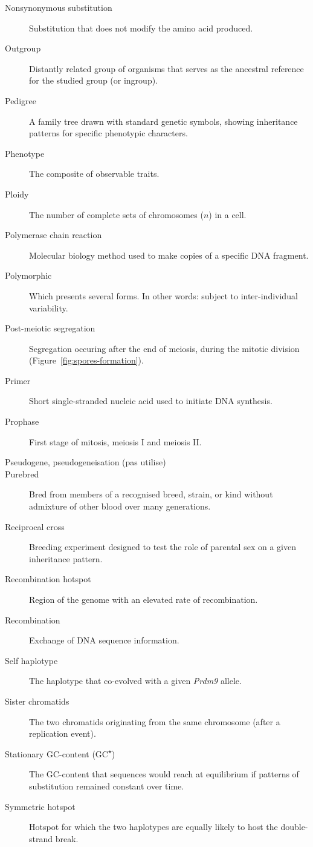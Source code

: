 \begin{alwayssingle}
\begin{description}
		\item[Nonsynonymous substitution] Substitution that does not modify the amino acid produced.
		\item[Outgroup] Distantly related group of organisms that serves as the ancestral reference for the studied group (or ingroup).
		\item[Pedigree] A family tree drawn with standard genetic symbols, showing inheritance patterns for specific phenotypic characters.
		\item[Phenotype] The composite of observable traits.
		\item[Ploidy] The number of complete sets of chromosomes ($n$) in a cell. 
		\item[Polymerase chain reaction] Molecular biology method used to make copies of a specific DNA fragment.
		\item[Polymorphic] Which presents several forms. In other words: subject to inter-individual variability.
		\item[Post-meiotic segregation] Segregation occuring after the end of meiosis, during the mitotic division (Figure~\ref{fig:spores-formation}).
		\item[Primer] Short single-stranded nucleic acid used to initiate DNA synthesis.
		\item[Prophase] First stage of mitosis, meiosis I and meiosis II\@.
		\item[Pseudogene, pseudogeneisation (pas utilise)]
		\item[Purebred] Bred from members of a recognised breed, strain, or kind without admixture of other blood over many generations.
		\item[Reciprocal cross] Breeding experiment designed to test the role of parental sex on a given inheritance pattern.
		\item[Recombination hotspot] Region of the genome with an elevated rate of recombination.
		\item[Recombination] Exchange of DNA sequence information.
		\item[Self haplotype] The haplotype that co-evolved with a given \textit{Prdm9} allele.
		\item[Sister chromatids] The two chromatids originating from the same chromosome (after a replication event).
		\item[Stationary GC-content (GC\textsuperscript{$\star$})] The GC-content that sequences would reach at equilibrium if patterns of substitution remained constant over time.
		\item[Symmetric hotspot] Hotspot for which the two haplotypes are equally likely to host the double-strand break.

\end{description}
\end{alwayssingle}
